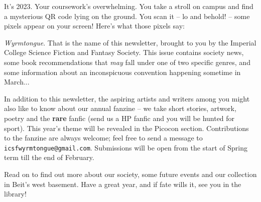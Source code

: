 It's 2023. Your coursework's overwhelming. You take a stroll on campus and find a mysterious QR code lying on the ground. You scan it -- lo and behold! -- some pixels appear on your screen! Here's what those pixels say:

\textit{Wyrmtongue}. That is the name of this newsletter, brought to you by the Imperial College Science Fiction and Fantasy Society. This issue contains society news, some book recommendations that \textit{may} fall under one of two specific genres, and some information about an inconspicuous convention happening sometime in March...

In addition to this newsletter, the aspiring artists and writers among you might also like to know about our annual fanzine -- we take short stories, artwork, poetry and the \textbf{rare} fanfic (send us a HP fanfic and you will be hunted for sport\footnotemark[2]{}). This year's theme will be revealed in the Picocon section. Contributions to the fanzine are always welcome; feel free to send a message to \texttt{icsfwyrmtongue@gmail.com}. Submissions will be open from the start of Spring term till the end of February.

Read on to find out more about our society, some future events and our collection in Beit's west basement. Have a great year, and if fate wills it, see you in the library!